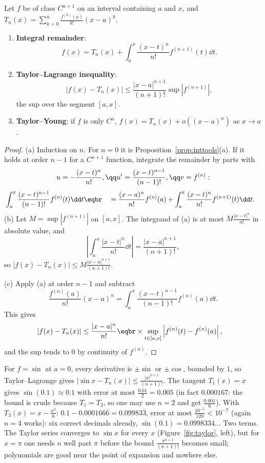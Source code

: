 \begin{theorem}\label{thm:taylor}
Let $f$ be of class $C^{n+1}$ on an interval containing $a$ and $x$, and $T_n(x)=\sum_{k=0}^n\frac{f^{(k)}(a)}{k!}(x-a)^k$.
\begin{enumerate}[label=(\alph*)]
\item \textbf{Integral remainder}:
\[f(x)=T_n(x)+\int_a^x\frac{(x-t)^n}{n!}f^{(n+1)}(t)\dd t.\]
\item \textbf{Taylor--Lagrange inequality}:
\[|f(x)-T_n(x)|\le\frac{|x-a|^{n+1}}{(n+1)!}\sup|f^{(n+1)}|,\]
the sup over the segment $[a,x]$.
\item \textbf{Taylor--Young}: if $f$ is only $C^n$, $f(x)=T_n(x)+o\left((x-a)^n\right)$ as $x\to a$.
\end{enumerate}
\end{theorem}
\begin{proof}
(a) Induction on $n$. For $n=0$ it is Proposition~\ref{prop:inttools}(a). If it holds at order $n-1$ for a $C^{n+1}$ function, integrate the remainder by parts with
\[
\begin{gathered}u=-\frac{(x-t)^n}{n!},\qq u'=\frac{(x-t)^{n-1}}{(n-1)!},\qq v=f^{(n)}:\end{gathered}
\]
\[
\begin{aligned}&\int_a^x\frac{(x-t)^{n-1}}{(n-1)!}f^{(n)}(t)\dd t\eqbr\quad=\frac{(x-a)^n}{n!}f^{(n)}(a)+\int_a^x\frac{(x-t)^n}{n!}f^{(n+1)}(t)\dd t.\end{aligned}
\]
(b) Let $M=\sup|f^{(n+1)}|$ on $[a,x]$. The integrand of (a) is at most $M\frac{|x-t|^n}{n!}$ in absolute value, and
\[
\left|\int_a^x\frac{|x-t|^n}{n!}\dd t\right|=\frac{|x-a|^{n+1}}{(n+1)!},
\]
so $|f(x)-T_n(x)|\le M\frac{|x-a|^{n+1}}{(n+1)!}$.

(c) Apply (a) at order $n-1$ and subtract
\[\frac{f^{(n)}(a)}{n!}(x-a)^n=\int_a^x\frac{(x-t)^{n-1}}{(n-1)!}f^{(n)}(a)\dd t.\]
This gives
\[\begin{aligned}|f(x)-T_n(x)|&\le\frac{|x-a|^n}{n!}\eqbr\times\sup_{t\in[a,x]}\left|f^{(n)}(t)-f^{(n)}(a)\right|,\end{aligned}\]
and the sup tends to $0$ by continuity of $f^{(n)}$.
\end{proof}

\begin{examplex}
For $f=\sin$ at $a=0$, every derivative is $\pm\sin$ or $\pm\cos$, bounded by $1$, so Taylor--Lagrange gives $|\sin x-T_n(x)|\le\frac{|x|^{n+1}}{(n+1)!}$. The tangent $T_1(x)=x$ gives
$\sin(0.1)\approx0.1$ with error at most $\frac{0.01}2=0.005$ (in fact $0.000167$: the bound is crude because $T_1=T_2$, so one may use $n=2$ and get $\frac{0.001}6$). With $T_3(x)=x-\frac{x^3}6$: $0.1-0.000166\overline6=0.09983\overline3$, error at most $\frac{10^{-5}}{120}<10^{-7}$ (again $n=4$ works): six correct decimals already, $\sin(0.1)=0.0998334\ldots$ Two terms. The Taylor series converges to $\sin x$ for every $x$ (Figure~\ref{fig:taylor}, left), but for $x=\pi$ one needs $n$ well past $\pi$ before the bound $\frac{\pi^{n+1}}{(n+1)!}$ becomes small; polynomials are good near the point of expansion and nowhere else.
\end{examplex}

